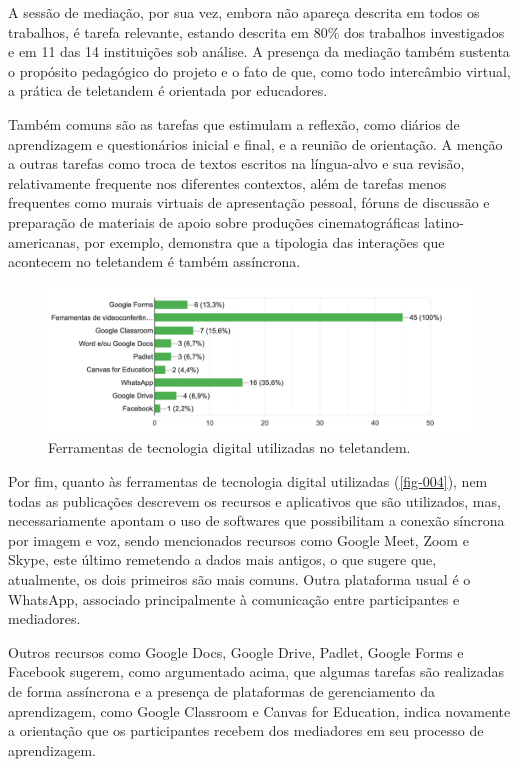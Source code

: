 \documentclass[portuguese]{textolivre}
\begin{document}
A sessão de mediação, por sua vez, embora não apareça descrita em todos os trabalhos, é tarefa relevante, estando descrita em 80\% dos trabalhos investigados e em 11 das 14 instituições sob análise. A presença da mediação também sustenta o propósito pedagógico do projeto e o fato de que, como todo intercâmbio virtual, a prática de teletandem é orientada por educadores.

Também comuns são as tarefas que estimulam a reflexão, como diários de aprendizagem e questionários inicial e final, e a reunião de orientação. A menção a outras tarefas como troca de textos escritos na língua-alvo e sua revisão, relativamente frequente nos diferentes contextos, além de tarefas menos frequentes como murais virtuais de apresentação pessoal, fóruns de discussão e preparação de materiais de apoio sobre produções cinematográficas latino-americanas, por exemplo, demonstra que a tipologia das interações que acontecem no teletandem é também assíncrona.

\begin{figure}[htbp]
  \centering
  \begin{minipage}{.75\textwidth}
    \includegraphics[width=\linewidth]{fig-004.png}
    \caption{Ferramentas de tecnologia digital utilizadas no teletandem.}
    \label{fig-004}
  \end{minipage}
\end{figure}

Por fim, quanto às ferramentas de tecnologia digital utilizadas (\autoref{fig-004}), nem todas as publicações descrevem os recursos e aplicativos que são utilizados, mas, necessariamente apontam o uso de softwares que possibilitam a conexão síncrona por imagem e voz, sendo mencionados recursos como Google Meet, Zoom e Skype, este último remetendo a dados mais antigos, o que sugere que, atualmente, os dois primeiros são mais comuns. Outra plataforma usual é o WhatsApp, associado principalmente à comunicação entre participantes e mediadores.

Outros recursos como Google Docs, Google Drive, Padlet, Google Forms e Facebook sugerem, como argumentado acima, que algumas tarefas são realizadas de forma assíncrona e a presença de plataformas de gerenciamento da aprendizagem, como Google Classroom e Canvas for Education, indica novamente a orientação que os participantes recebem dos mediadores em seu processo de aprendizagem.
\end{document}
